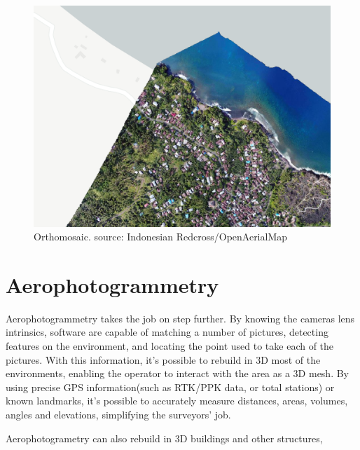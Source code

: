 \begin{figure}
\centering
  \includegraphics[width=\linewidth]{figs/orthomosaic.png}
  \caption{Orthomosaic. source: Indonesian Redcross/OpenAerialMap}
  \label{fig:orthomosaic}
\end{figure}


\section{Aerophotogrammetry}

Aerophotogrammetry takes the job on step further. By knowing the cameras lens intrinsics, software are capable of matching a number of pictures, detecting features on the environment, and locating the point used to take each of the pictures. With this information, it's possible to rebuild in 3D most of the environments, enabling the operator to interact with the area as a 3D mesh.
By using precise GPS information(such as RTK/PPK data, or total stations) or known landmarks, it's possible to accurately measure distances, areas, volumes, angles and elevations, simplifying the surveyors' job.

Aerophotogrametry can also rebuild in 3D buildings and other structures, 
